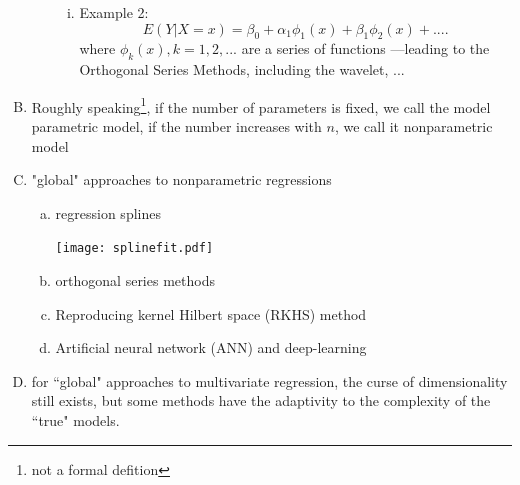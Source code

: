 \documentclass[19pt,landscaoe]{article}
\begin{document}
\begin{enumerate}[(A)]
\begin{enumerate}[(a)]
\begin{enumerate}[(i)]
    \item Example 2:
    $$ E(Y|X=x) = \beta_0 + \alpha_1 \phi_1(x) + \beta_1 \phi_2(x) + ....  $$
    where $ \phi_k(x), k = 1, 2, ... $ are a series of functions  ---leading to the Orthogonal Series Methods, including the wavelet, ...    
    \end{enumerate}

\end{enumerate}
\item Roughly speaking\footnote{not a formal defition}, if the number of parameters is fixed, we call the model parametric model, if the number increases with $n$, we call it  nonparametric model

\item "global" approaches to nonparametric regressions
\begin{enumerate}[(a)]

\item regression splines

\centerline{\texttt{[image: splinefit.pdf]}}

\newpage 
\item orthogonal series methods

\item Reproducing kernel Hilbert space (RKHS) method

\item Artificial neural network (ANN) and deep-learning

\end{enumerate}

\item for ``global" approaches to multivariate regression, the curse of dimensionality still exists, but some methods have the adaptivity to the complexity of the ``true" models.

\end{enumerate}


        
\end{document}
